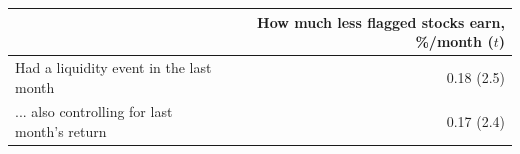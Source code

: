 \small
\begin{tabular}{lr}
\toprule
 & How much less flagged stocks earn, \%/month ($t$) \\
\midrule
Had a liquidity event in the last month & 0.18 (2.5) \\
... also controlling for last month's return & 0.17 (2.4) \\
\bottomrule
\end{tabular}